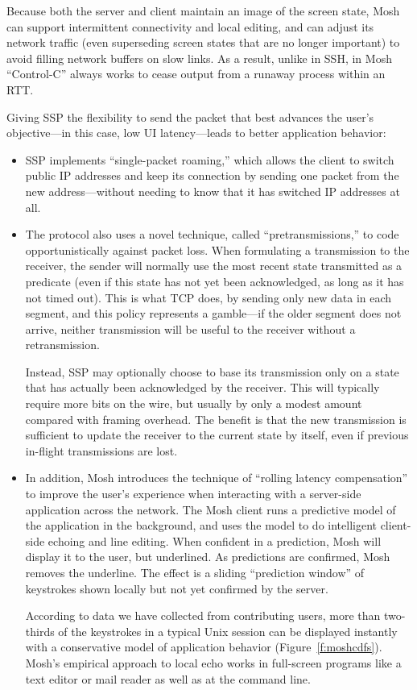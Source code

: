 \documentclass{article}
\begin{document}
Because both the server and client maintain an image of the screen
state, Mosh can support intermittent connectivity and local editing,
and can adjust its network traffic (even superseding screen states
that are no longer important) to avoid filling network buffers on slow
links. As a result, unlike in SSH, in Mosh ``Control-C'' always works
to cease output from a runaway process within an RTT.

Giving SSP the flexibility to send the packet that best advances the
user's objective---in this case, low UI latency---leads to better
application behavior:

\begin{itemize}

\item SSP implements ``single-packet roaming,'' which allows the client to
switch public IP addresses and keep its connection by sending one
packet from the new address---without needing to know that it has
switched IP addresses at all.

\item The protocol also uses a novel technique, called ``pretransmissions,''
to code opportunistically against packet loss. When formulating a
transmission to the receiver, the sender will normally use the most
recent state transmitted as a predicate (even if this state has not
yet been acknowledged, as long as it has not timed out). This is what
TCP does, by sending only new data in each segment, and this policy
represents a gamble---if the older segment does not arrive, neither
transmission will be useful to the receiver without a retransmission.

Instead, SSP may optionally choose to base its transmission only on
a state that has actually been acknowledged by the receiver. This will
typically require more bits on the wire, but usually by only a modest
amount compared with framing overhead. The benefit is that the new
transmission is sufficient to update the receiver to the current state
by itself, even if previous in-flight transmissions are lost.

\item In addition, Mosh introduces the technique of ``rolling latency
  compensation'' to improve the user's experience when interacting
  with a server-side application across the network. The Mosh client
  runs a predictive model of the application in the background, and
  uses the model to do intelligent client-side echoing and line
  editing. When confident in a prediction, Mosh will display it to the
  user, but underlined. As predictions are confirmed, Mosh removes the
  underline. The effect is a sliding ``prediction window'' of
  keystrokes shown locally but not yet confirmed by the server.

  According to data we have collected from contributing users, more
  than two-thirds of the keystrokes in a typical Unix session can be
  displayed instantly with a conservative model of application
  behavior (Figure~\ref{f:moshcdfs}). Mosh's empirical approach to
  local echo works in full-screen programs like a text editor or mail
  reader as well as at the command line.

\end{itemize}
\end{document}
